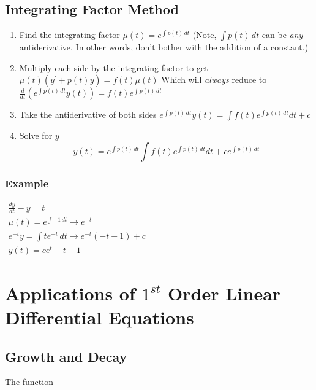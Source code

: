 \documentclass[12pt,landscape,twocolumn]{article}
\begin{document}
    \subsection{Integrating Factor Method}
    \begin{enumerate}
    \item Find the integrating factor
        $
        \mu(t) = e^{\int p(t) \, dt}
        $
        (Note, $\int p(t) \, dt$ can be \textit{any} antiderivative. In other words, don't bother with the addition of a constant.)
    \item Multiply each side by the integrating factor to get
        $
        \mu(t)(y^\prime + p(t)y) = f(t)\mu(t)
        $
        Which will \textit{always} reduce to
        $
        \frac{d}{dt} \left( e^{\int p(t) \, dt} y(t) \right) = f(t) e^{\int p(t) \, dt}
        $
    \item Take the antiderivative of both sides
        $
        e^{\int p(t) \, dt} y(t) = \int f(t) e^{\int p(t) \, dt} dt + c
        $
    \item Solve for $y$
        \begin{equation}\label{eq:ifmethod}
        y(t) = e^{\int p(t) \, dt} \int f(t) e^{\int p(t) \, dt} dt + c e^{\int p(t) \, dt}
        \end{equation}
    \end{enumerate}

        \subsubsection{Example}
        $
        \begin{aligned}
        \frac{dy}{dt} - y = t\\
        \mu(t) = e^{\int -1 \, dt} \to e^{-t}\\
        e^{-t}y = \int t e^{-t} \, dt \to e^{-t} (-t - 1) + c\\
        y(t) = c e^t - t - 1
        \end{aligned}
        $

\section{Applications of $1^{st}$ Order Linear Differential Equations}
    \subsection{Growth and Decay}

    The function
\end{document}
